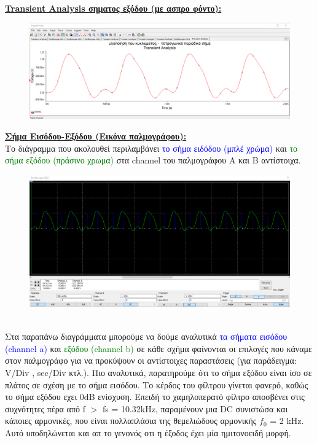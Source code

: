 \documentclass{article}
\begin{document}
{\begin{figure}[h!]
\end{figure} \\
\textbf{\underline{Transient Analysis σηματος εξόδου (με ασπρο φόντο):}}
\begin{figure}[h!]
\centering
 	\advance\leftskip-3cm
  \includegraphics[width=180mm,scale=2]{output2.png}
\end{figure} 
 \clearpage
 \textbf{\underline{Σήμα Εισόδου-Εξόδου (Εικόνα παλμογράφου):}} 
 \\[1.4\baselineskip]
 Το διάγραμμα που ακολουθεί περιλαμβάνει \textcolor{blue}{το σήμα ειδόδου (μπλέ χρώμα)} και \textcolor{green}{το σήμα εξόδου (πράσινο χρωμα)} στα channel του παλμογράφου Α και Β αντίστοιχα.  \\[0.4\baselineskip]
 \begin{figure}[h!]
\centering
 	\advance\leftskip-2.8cm
  \includegraphics[width=180mm,scale=2]{input-output.png}
\end{figure}   \\[1.4\baselineskip]
Στα παραπάνω διαγράμματα μπορούμε να δούμε αναλυτικά \textcolor{blue}{τα σήματα εισόδου (channel a)} και \textcolor{green}{εξόδου (channel b)} σε κάθε σχήμα φαίνονται οι επιλογές που κάναμε στον παλμογράφο για να προκύψουν οι αντίστοιχες παραστάσεις (για παράδειγμα: V/Div ,  sec/Div κτλ.).
Πιο αναλυτικά, παρατηρούμε ότι το σήμα εξόδου είναι ίσο σε πλάτος σε σχέση με το σήμα εισόδου. Το κέρδος του φίλτρου γίνεται φανερό, καθώς το σήμα εξόδου εχει 0dB ενίσχυση. Επειδή το χαμηλοπερατό φίλτρο αποσβένει στις συχνότητες πέρα από f $>$ fs = 10.32kHz, παραμένουν μια DC συνιστώσα και κάποιες αρμονικές, που είναι πολλαπλάσια της θεμελιώδους αρμονικής $f_0$ = 2 kHz. Αυτό υποδηλώνεται και απ το γενονός οτι η έξοδος έχει μία ημιτονοειδή μορφή.
\clearpage
}
\end{document}
